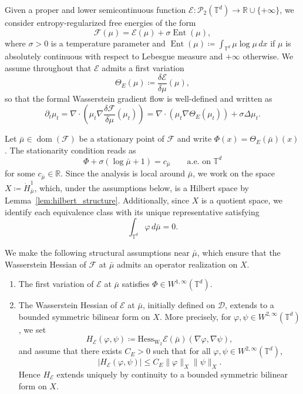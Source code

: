 \documentclass[11pt]{article}
\numberwithin{equation}{section}
\theoremstyle{definition}
\newcommand{\R}{\mathbb{R}}
\newcommand{\T}{\mathbb{T}}
\newcommand{\Pcal}{\mathcal{P}}
\newcommand{\F}{\mathcal{F}}
\newcommand{\E}{\mathcal{E}}
\newcommand{\Wtwo}{\operatorname{W}_2}
\newcommand{\Ent}{\operatorname{Ent}}
\newcommand{\potential}[1][\mu]{\dot{H}^1_{#1}}
\begin{document}
Given a proper and lower semicontinuous function $\E : \Pcal_2(\T^d) \to \R \cup \{+\infty\}$, we consider entropy-regularized free energies of the form
\[
\F(\mu) = \E(\mu) + \sigma\Ent(\mu),
\]
where $\sigma > 0$ is a temperature parameter and $\Ent(\mu) \coloneqq \int_{\T^d} \mu\log\mu\,dx$ if $\mu$ is absolutely continuous with respect to Lebesgue measure and $+\infty$ otherwise.
We assume throughout that $\E$ admits a first variation
\[
\Theta_E(\mu) \coloneqq \frac{\delta\E}{\delta\mu}(\mu),
\]
so that the formal Wasserstein gradient flow is well-defined and written as
\[
\partial_t\mu_t = \nabla\cdot\left(\mu_t\nabla\frac{\delta\F}{\delta\mu}(\mu_t)\right) = \nabla\cdot\left(\mu_t \nabla \Theta_E(\mu_t)\right) + \sigma \Delta \mu_t.
\]

Let $\bar\mu \in \operatorname{dom}(\F)$ be a stationary point of $\F$ and write $\Phi(x) = \Theta_E(\bar\mu)(x)$.
The stationarity condition reads as
\begin{equation}
    \label{eq:stationarity}
    \Phi + \sigma(\log\bar\mu + 1) = c_{\bar\mu} \qquad \text{a.e.\ on } \T^d
\end{equation}
for some $c_{\bar\mu} \in \R$.
Since the analysis is local around $\bar\mu$, we work on the space $X \coloneqq \potential[\bar\mu]$, which, under the assumptions below, is a Hilbert space by Lemma~\ref{lem:hilbert_structure}.
Additionally, since $X$ is a quotient space, we identify each equivalence class with its unique representative satisfying
\begin{equation}
    \label{eq:mean_zero}
    \int_{\T^d} \varphi\,d\bar\mu = 0.
\end{equation}

We make the following structural assumptions near $\bar\mu$, which ensure that the Wasserstein Hessian of $\F$ at $\bar\mu$ admits an operator realization on $X$.
\begin{enumerate}[label=(H\arabic*),ref=(H\arabic*)]
    \item\label{ass:H1} The first variation of $\E$ at $\bar\mu$ satisfies $\Phi \in W^{1,\infty}(\T^d)$.

    \item\label{ass:H2} The Wasserstein Hessian of $\E$ at $\bar\mu$, initially defined on $\mathscr{D}$, extends to a bounded symmetric bilinear form on $X$.
    More precisely, for $\varphi, \psi \in W^{2,\infty}(\T^d)$, we set
    \[
    H_\E(\varphi,\psi) \coloneqq \mathrm{Hess}_{\Wtwo} \E(\bar\mu)(\nabla\varphi,\nabla\psi), 
    \]
    and assume that there exists $C_E > 0$ such that for all $\varphi, \psi \in W^{2,\infty}(\T^d)$, 
    \[
    |H_\E(\varphi,\psi)| \le C_E\|\varphi\|_X\|\psi\|_X. 
    \]
    Hence $H_\E$ extends uniquely by continuity to a bounded symmetric bilinear form on $X$.
\end{enumerate}
\end{document}
